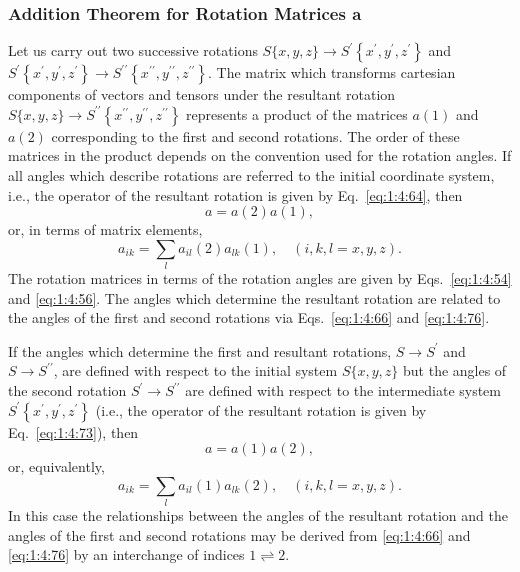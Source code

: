 \subsubsection{Addition Theorem for Rotation Matrices a}
Let us carry out two successive rotations \(S\{x, y, z\} \rightarrow S^{\prime}\left\{x^{\prime}, y^{\prime}, z^{\prime}\right\}\) and \(S^{\prime}\left\{x^{\prime}, y^{\prime}, z^{\prime}\right\} \rightarrow S^{\prime \prime}\left\{x^{\prime \prime}, y^{\prime \prime}, z^{\prime \prime}\right\}\). The matrix which transforms cartesian components of vectors and tensors under the resultant rotation \(S\{x, y, z\} \rightarrow S^{\prime \prime}\left\{x^{\prime \prime}, y^{\prime \prime}, z^{\prime \prime}\right\}\) represents a product of the matrices \(a(1)\) and \(a(2)\) corresponding to the first and second rotations. The order of these matrices in the product depends on the convention used for the rotation angles. If all angles which describe rotations are referred to the initial coordinate system, i.e., the operator of the resultant rotation is given by Eq.~\eqref{eq:1:4:64}, then
\begin{equation}
a=a(2) a(1), \label{eq:1:4:79}
\end{equation}
or, in terms of matrix elements,
\begin{equation}
a_{i k}=\sum_{l} a_{i l}(2) a_{l k}(1), \quad(i, k, l=x, y, z). \label{eq:1:4:80}
\end{equation}
The rotation matrices in terms of the rotation angles are given by Eqs.~\eqref{eq:1:4:54} and \eqref{eq:1:4:56}. The angles which determine the resultant rotation are related to the angles of the first and second rotations via Eqs.~\eqref{eq:1:4:66} and \eqref{eq:1:4:76}.

If the angles which determine the first and resultant rotations, \(S \rightarrow S^{\prime}\) and \(S \rightarrow S^{\prime \prime}\), are defined with respect to the initial system \(S\{x, y, z\}\) but the angles of the second rotation \(S^{\prime} \rightarrow S^{\prime \prime}\) are defined with respect to the intermediate system \(S^{\prime}\left\{x^{\prime}, y^{\prime}, z^{\prime}\right\}\) (i.e., the operator of the resultant rotation is given by Eq.~\eqref{eq:1:4:73}), then
\begin{equation}
a=a(1) a(2), \label{eq:1:4:81}
\end{equation}
or, equivalently,
\begin{equation}
a_{i k}=\sum_{l} a_{i l}(1) a_{l k}(2), \quad(i, k, l=x, y, z) .\label{eq:1:4:82}
\end{equation}
In this case the relationships between the angles of the resultant rotation and the angles of the first and second rotations may be derived from \eqref{eq:1:4:66} and \eqref{eq:1:4:76} by an interchange of indices \(1 \rightleftharpoons 2\).


